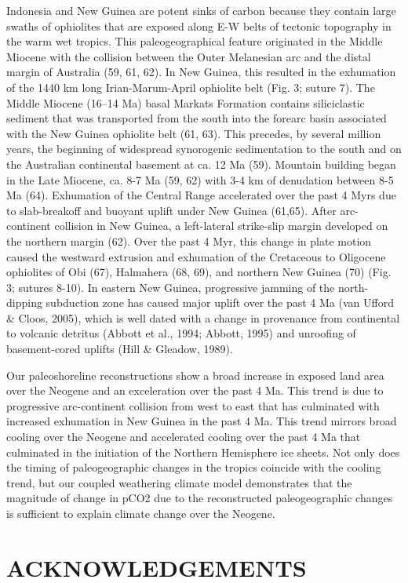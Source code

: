 \documentclass[11pt,letterpaper]{article}
\begin{document}
Indonesia and New Guinea are potent sinks of carbon because they contain large swaths of ophiolites that are exposed along E-W belts of tectonic topography in the warm wet tropics. This paleogeographical feature originated in the Middle Miocene with the collision between the Outer Melanesian arc and the distal margin of Australia (59, 61, 62). In New Guinea, this resulted in the exhumation of the 1440 km long Irian-Marum-April ophiolite belt (Fig. 3; suture 7). The Middle Miocene (16–14 Ma) basal Markats Formation contains siliciclastic sediment that was transported from the south into the forearc basin associated with the New Guinea ophiolite belt (61, 63). This precedes, by several million years, the beginning of widespread synorogenic sedimentation to the south and on the Australian continental basement at ca. 12 Ma (59). Mountain building began in the Late Miocene, ca. 8-7 Ma (59, 62) with 3-4 km of denudation between 8-5 Ma (64). Exhumation of the Central Range accelerated over the past 4 Myrs due to slab-breakoff and buoyant uplift under New Guinea (61,65). After arc-continent collision in New Guinea, a left-lateral strike-slip margin developed on the northern margin (62). Over the past 4 Myr, this change in plate motion caused the westward extrusion and exhumation of the Cretaceous to Oligocene ophiolites of Obi (67), Halmahera (68, 69), and northern New Guinea (70) (Fig. 3; sutures 8-10). In eastern New Guinea, progressive jamming of the north-dipping subduction zone has caused major uplift over the past 4 Ma (van Ufford & Cloos, 2005), which is well dated with a change in provenance from continental to volcanic detritus (Abbott et al., 1994; Abbott, 1995) and unroofing of basement-cored uplifts (Hill & Gleadow, 1989). 

Our paleoshoreline reconstructions show a broad increase in exposed land area over the Neogene and an exceleration over the past 4 Ma. This trend is due to progressive arc-continent collision from west to east that has culminated with increased exhumation in New Guinea in the past 4 Ma. This trend mirrors broad cooling over the Neogene and accelerated cooling over the past 4 Ma that culminated in the initiation of the Northern Hemisphere ice sheets. Not only does the timing of paleogeographic changes in the tropics coincide with the cooling trend, but our coupled weathering climate model demonstrates that the magnitude of change in pCO2 due to the reconstructed paleogeographic changes is sufficient to explain climate change over the Neogene.

\section*{ACKNOWLEDGEMENTS \label{sec:ACKNOWLEDGEMENTS}}
\end{document}

